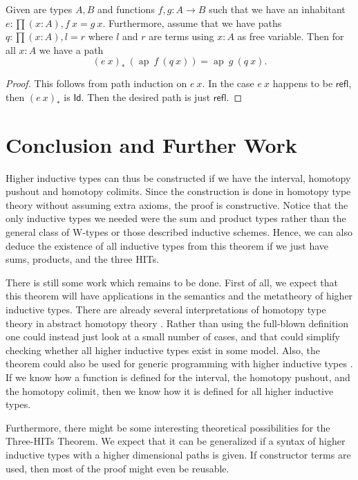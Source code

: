 \documentclass[a4paper,UKenglish]{lipics-v2016}
\newcommand{\Boperator}[1]{\mathsf{#1}}
\newcommand{\ap}[0]{\operatorname{ap}}
\newcommand{\idmap}[0]{\Boperator{Id}}
\newcommand{\refl}[0]{\Boperator{refl}}
\begin{document}
\begin{lemma}
\label{lem:pathext}
Given are types $A, B$ and functions $f, g : A \rightarrow B$ such that we have an inhabitant $e : \prod (x : A), f \> x = g \> x$.
Furthermore, assume that we have paths $q : \prod (x : A), l = r$ where $l$ and $r$ are terms using $x : A$ as free variable.
Then for all $x : A$ we have a path
\[
(e \> x)_* \> (\ap \> f \> (q \> x)) = \ap \> g \> (q \> x).
\]
\end{lemma}

\begin{proof}
This follows from path induction on $e \> x$.
In the case $e \> x$ happens to be $\refl$, then $(e \> x)_*$ is $\idmap$.
Then the desired path is just $\refl$.
\end{proof}

\section{Conclusion and Further Work}
Higher inductive types can thus be constructed if we have the interval, homotopy pushout and homotopy colimits.
Since the construction is done in homotopy type theory without assuming extra axioms, the proof is constructive.
Notice that the only inductive types we needed were the sum and product types rather than the general class of W-types or those described inductive schemes.
Hence, we can also deduce the existence of all inductive types from this theorem if we just have sums, products, and the three HITs. 

There is still some work which remains to be done.
First of all, we expect that this theorem will have applications in the semantics and the metatheory of higher inductive types.
There are already several interpretations of homotopy type theory in abstract homotopy theory \cite{arndt2011homotopy,awodey2009homotopy,bezem2014model,cohen2016cubical,kapulkin2012simplicial}.
Rather than using the full-blown definition one could instead just look at a small number of cases, and that could simplify checking whether all higher inductive types exist in some model.
Also, the theorem could also be used for generic programming with higher inductive types \cite{altenkirch2003generic}.
If we know how a function is defined for the interval, the homotopy pushout, and the homotopy colimit, then we know how it is defined for all higher inductive types.

Furthermore, there might be some interesting theoretical possibilities for the Three-HITs Theorem.
We expect that it can be generalized if a syntax of higher inductive types with a higher dimensional paths is given.
If constructor terms are used, then most of the proof might even be reusable.
\end{document}
